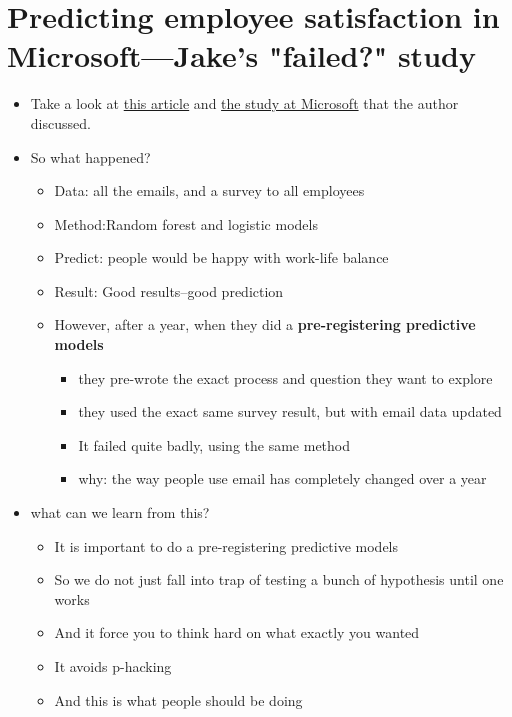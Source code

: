 \section{Predicting employee satisfaction in Microsoft---Jake's "failed?" study}
\begin{itemize}
    \item Take a look at \href{https://www.nytimes.com/2019/02/15/opinion/sunday/email-etiquette.html}{this article} and \href{https://medium.com/@duncanjwatts/the-organizational-spectroscope-7f9f239a897c}{the study at Microsoft} that the author discussed.
    \item So what happened? 
    \begin{itemize}
        \item Data: all the emails, and a survey to all employees
        \item Method:Random forest and logistic models
        \item Predict: people would be happy with work-life balance
        \item Result: Good results--good prediction
        \item However, after a year, when they did a \textbf{pre-registering predictive models}
        \begin{itemize}
            \item they pre-wrote the exact process and question they want to explore
            \item they used the exact same survey result, but with email data updated
            \item It failed quite badly, using the same method
            \item why: the way people use email has completely changed over a year
        \end{itemize}
    \end{itemize}
    \item what can we learn from this?
    \begin{itemize}
        \item It is important to do a pre-registering predictive models
        \item So we do not just fall into trap of testing a bunch of hypothesis until one works
        \item And it force you to think hard on what exactly you wanted
        \item It avoids p-hacking
        \item And this is what people should be doing
    \end{itemize}
\end{itemize}


